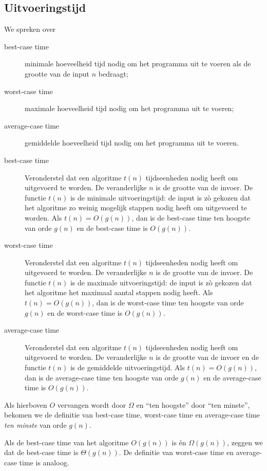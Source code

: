 \subsection{Uitvoeringstijd}

We spreken over 
\begin{description}
\item[best-case time] minimale hoeveelheid tijd nodig om het programma uit te voeren als de grootte van de input $n$ bedraagt;
\item[worst-case time] maximale hoeveelheid tijd nodig om het programma uit te voeren;
\item[average-case time] gemiddelde hoeveelheid tijd nodig om het programma uit te voeren.
\end{description}

\begin{description}
\item[best-case time] Veronderstel dat een algoritme $t(n)$ tijdseenheden nodig heeft om uitgevoerd te worden. De veranderlijke $n$ is de grootte van de invoer. De functie  $t(n)$ is de minimale uitvoeringstijd: de input is zò gekozen dat het algoritme zo weinig mogelijk stappen nodig heeft om uitgevoerd te worden. Als 
$t(n)=O(g(n))$, dan is de best-case time ten hoogste van orde $g(n)$ en de best-case time is $O(g(n))$.
\item[worst-case time] Veronderstel dat een algoritme $t(n)$ tijdseenheden nodig heeft om uitgevoerd te worden. De veranderlijke $n$ is de grootte van de invoer. De functie $t(n)$ is de maximale uitvoeringstijd: de input is zò gekozen dat het algoritme het maximaal aantal stappen nodig heeft. Als 
$t(n)=O(g(n))$, dan is de worst-case time ten hoogste van orde $g(n)$ en de worst-case time is $O(g(n))$.
\item[average-case time] Veronderstel dat een algoritme $t(n)$ tijdseenheden nodig heeft om uitgevoerd te worden. De veranderlijke $n$ is de grootte van de invoer en de functie $t(n)$ is de gemiddelde uitvoeringstijd. Als $t(n)=O(g(n))$, dan is de average-case time ten hoogste van orde $g(n)$ en de average-case time is $O(g(n))$.

\end{description}

Als hierboven $O$ vervangen wordt door $\Omega$ en ``ten hoogste'' door ``ten minste'', bekomen we de definitie van best-case time, worst-case time en average-case time \emph{ten minste} van orde $g(n)$. 

Als de best-case time van het algoritme $O(g(n))$ is én $\Omega(g(n))$, zeggen we dat de best-case time is $\Theta(g(n))$. De definitie van worst-case time en average-case time is analoog.

